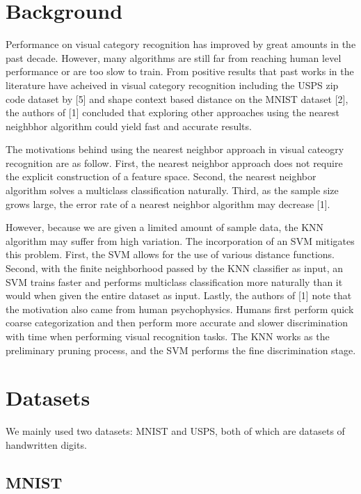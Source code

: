 \documentclass[11pt,letterpaper]{article}
\begin{document}
\section{Background}

Performance on visual category recognition has improved by great amounts in the past decade. However, many algorithms are still far from reaching human level performance or are too slow to train. From positive results that past works in the literature have acheived in visual category recognition including the USPS zip code dataset by [5] and shape context based distance on the MNIST dataset [2], the authors of [1] concluded that exploring other approaches using the nearest neighbhor algorithm could yield fast and accurate results.

The motivations behind using the nearest neighbor approach in visual cateogry recognition are as follow. First, the nearest neighbor approach does not require the explicit construction of a feature space. Second, the nearest neighbor algorithm solves a multiclass classification naturally. Third, as the sample size grows large, the error rate of a nearest neighbor algorithm may decrease [1].

However, because we are given a limited amount of sample data, the KNN algorithm may suffer from high variation. The incorporation of an SVM mitigates this problem. First, the SVM allows for the use of various distance functions. Second, with the finite neighborhood passed by the KNN classifier as input, an SVM trains faster and performs multiclass classification more naturally than it would when given the entire dataset as input. Lastly, the authors of [1] note that the motivation also came from human psychophysics. Humans first perform quick coarse categorization and then perform more accurate and slower discrimination with time when performing visual recognition tasks. The KNN works as the preliminary pruning process, and the SVM performs the fine discrimination stage.

\section{Datasets}

We mainly used two datasets: MNIST and USPS, both of which are datasets of handwritten digits.

\subsection{MNIST}
\end{document}
